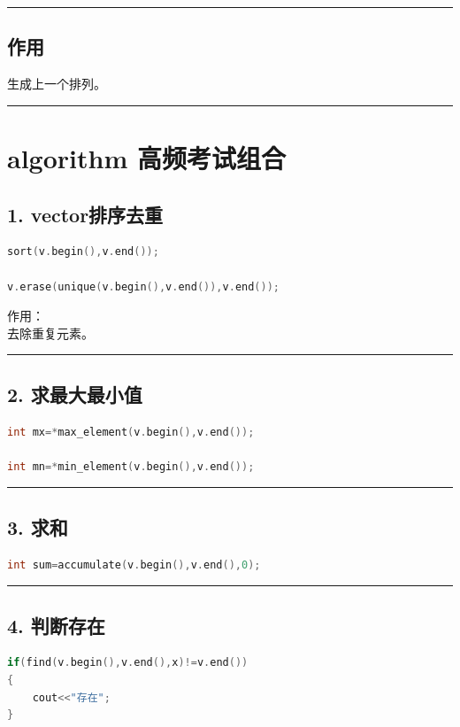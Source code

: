 \documentclass[9pt,twocolumn]{extarticle}
\begin{document}
\noindent\rule{\linewidth}{0.4pt}

\subsection{作用}
生成上一个排列。

\noindent\rule{\linewidth}{0.4pt}

\section{algorithm 高频考试组合}

\subsection{1. vector排序去重}
\begin{lstlisting}[language=C++]
sort(v.begin(),v.end());

v.erase(unique(v.begin(),v.end()),v.end());
\end{lstlisting}
作用：\\
去除重复元素。

\noindent\rule{\linewidth}{0.4pt}

\subsection{2. 求最大最小值}
\begin{lstlisting}[language=C++]
int mx=*max_element(v.begin(),v.end());

int mn=*min_element(v.begin(),v.end());
\end{lstlisting}

\noindent\rule{\linewidth}{0.4pt}

\subsection{3. 求和}
\begin{lstlisting}[language=C++]
int sum=accumulate(v.begin(),v.end(),0);
\end{lstlisting}

\noindent\rule{\linewidth}{0.4pt}

\subsection{4. 判断存在}
\begin{lstlisting}[language=C++]
if(find(v.begin(),v.end(),x)!=v.end())
{
    cout<<"存在";
}
\end{lstlisting}
\end{document}
